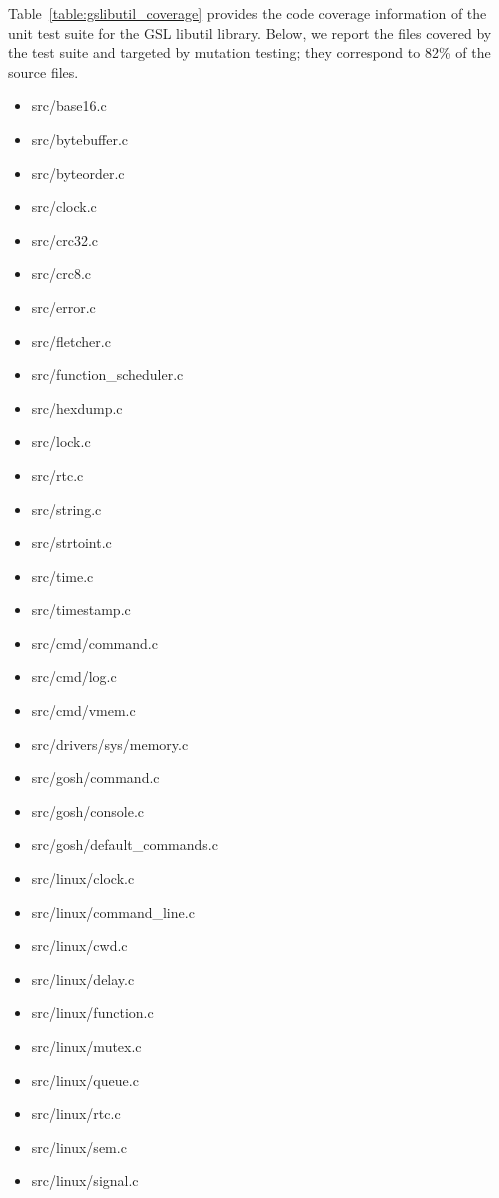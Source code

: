 Table~\ref{table:gslibutil_coverage} provides the code coverage information of the unit test suite for the GSL libutil library. 
Below, we report the files covered by the test suite and targeted by mutation testing; they correspond to 82\% of the source files. %

\begin{itemize}
	\item src/base16.c
	\item src/bytebuffer.c
	\item src/byteorder.c
	\item src/clock.c
	\item src/crc32.c
	\item src/crc8.c
	\item src/error.c
	\item src/fletcher.c
	\item src/function\_scheduler.c
	\item src/hexdump.c
	\item src/lock.c
	\item src/rtc.c
	\item src/string.c
	\item src/strtoint.c
	\item src/time.c
	\item src/timestamp.c
	\item src/cmd/command.c
	\item src/cmd/log.c
	\item src/cmd/vmem.c
	\item src/drivers/sys/memory.c
	\item src/gosh/command.c
	\item src/gosh/console.c
	\item src/gosh/default\_commands.c
	\item src/linux/clock.c
	\item src/linux/command\_line.c
	\item src/linux/cwd.c
	\item src/linux/delay.c
	\item src/linux/function.c
	\item src/linux/mutex.c
	\item src/linux/queue.c
	\item src/linux/rtc.c
	\item src/linux/sem.c
	\item src/linux/signal.c

\end{itemize}
